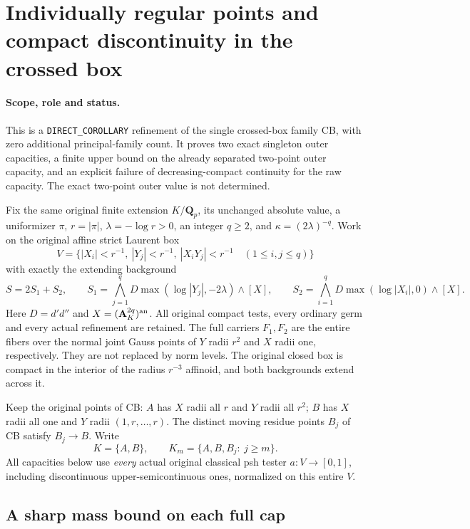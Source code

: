 \section{Individually regular points and compact discontinuity in the crossed box}
\label{sec:r16-crossed-singleton-outer-bounds}

\paragraph{Scope, role and status.}
This is a \texttt{DIRECT\_COROLLARY} refinement of the single
crossed-box family CB, with zero additional principal-family count.
It proves two exact singleton outer capacities, a finite upper bound
on the already separated two-point outer capacity, and an explicit
failure of decreasing-compact continuity for the raw capacity.
The exact two-point outer value is not determined.

Fix the same original finite extension $K/\mathbf Q_p$, its unchanged
absolute value, a uniformizer $\pi$, $r=|\pi|$, $\lambda=-\log r>0$,
an integer $q\ge2$, and $\kappa=(2\lambda)^{-q}$. Work on the original
affine strict Laurent box
\[
 V=\{|X_i|<r^{-1},\ |Y_j|<r^{-1},\ |X_iY_j|<r^{-1}
                                      \quad(1\le i,j\le q)\}
 \tag{CO1}
\]
with exactly the extending background
\[
 S=2S_1+S_2,\qquad
 S_1=\bigwedge_{j=1}^qD\max(\log|Y_j|,-2\lambda)\wedge[X],
 \qquad
 S_2=\bigwedge_{i=1}^qD\max(\log|X_i|,0)\wedge[X].
 \tag{CO2}
\]
Here $D=d'd''$ and $X=(\mathbf A_K^{2q})^{\rm an}$.
All original compact tests, every ordinary germ and every actual
refinement are retained. The full carriers $F_1,F_2$ are the entire
fibers over the normal joint Gauss points of $Y$ radii $r^2$ and
$X$ radii one, respectively. They are not replaced by norm levels.
The original closed box is compact in the interior of the radius
$r^{-3}$ affinoid, and both backgrounds extend across it.

Keep the original points of CB:
$A$ has $X$ radii all $r$ and $Y$ radii all $r^2$;
$B$ has $X$ radii all one and $Y$ radii $(1,r,\ldots,r)$.
The distinct moving residue points $B_j$ of CB satisfy $B_j\to B$.
Write
\[
       K=\{A,B\},\qquad K_m=\{A,B,B_j:\ j\ge m\}.
 \tag{CO3}
\]
All capacities below use \emph{every} actual original classical
psh tester $a:V\to[0,1]$, including discontinuous upper-semicontinuous
ones, normalized on this entire $V$.

\subsection*{A sharp mass bound on each full cap}

